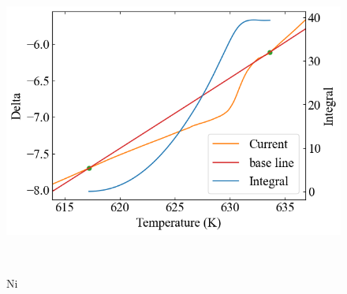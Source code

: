 \documentclass[9pt,dvipdfmx,a4paper]{jsarticle}
\begin{document}
\begin{figure}[hbt]
\begin{minipage}[t]{0.245\columnwidth}
    \end{minipage}
    \hfill
    \begin{minipage}[t]{0.245\columnwidth}
        \centering
        \includegraphics[width = \columnwidth]{appendix/Ni-dSdt-cool.png}
    \end{minipage}\\
    \caption{Ni}


\end{figure}
\end{document}
